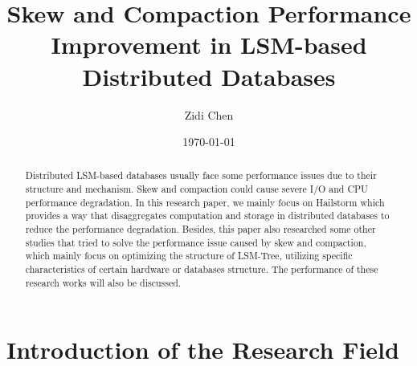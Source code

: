 \documentclass[a4paper,10pt,twoside]{article}
\title{Skew and Compaction Performance Improvement in LSM-based Distributed Databases}
\author{Zidi Chen}
\date{\today}
\begin{document}
\maketitle

\begin{abstract}
	Distributed LSM-based databases usually face some performance issues due to their structure and mechanism.
	Skew and compaction could cause severe I/O and CPU performance degradation.
	In this research paper, we mainly focus on Hailstorm which provides a way that disaggregates computation and storage in distributed databases to reduce the performance degradation.
	Besides, this paper also researched some other studies that tried to solve the performance issue caused by skew and compaction, which mainly focus on optimizing the structure of LSM-Tree, 
	utilizing specific characteristics of certain hardware or databases structure. 
	The performance of these research works will also be discussed.
\end{abstract}

\tableofcontents

\section{Introduction of the Research Field}
\label{Intro}
\end{document}
